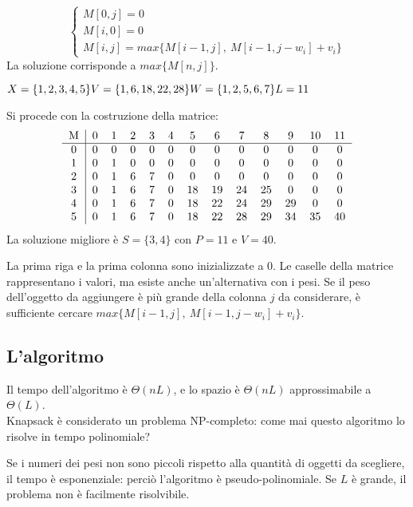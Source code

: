 $$\begin{cases}
M[0, j] = 0 \\
M[i, 0] = 0 \\
M[i, j] = max\{M[i-1, j],\ M[i-1, j-w_i] + v_i\}
\end{cases}$$
La soluzione corrisponde a $max\{M[n, j]\}$.

\begin{example}{}{}
$X = \{1, 2, 3, 4, 5\} \\
V = \{1, 6, 18, 22, 28\} \\
W = \{1, 2, 5, 6, 7\} \\
L = 11$

Si procede con la costruzione della matrice:
$$\begin{tabular}{c | c c c c c c c c c c c c}
	M & 0 & 1 & 2 & 3 & 4 & 5 & 6 & 7 & 8 & 9 & 10 & 11 \\
	\hline
	0 & 0 & 0 & 0 & 0 & 0 & 0 & 0 & 0 & 0 & 0 & 0 & 0 \\
	1 & 0 & 1 & 0 & 0 & 0 & 0 & 0 & 0 & 0 & 0 & 0 & 0 \\
	2 & 0 & 1 & 6 & 7 & 0 & 0 & 0 & 0 & 0 & 0 & 0 & 0 \\
	3 & 0 & 1 & 6 & 7 & 0 & 18 & 19 & 24 & 25 & 0 & 0 & 0 \\
	4 & 0 & 1 & 6 & 7 & 0 & 18 & 22 & 24 & 29 & 29 & 0 & 0 \\
	5 & 0 & 1 & 6 & 7 & 0 & 18 & 22 & 28 & 29 & 34 & 35 & 40 \\
\end{tabular}$$
La soluzione migliore è $S = \{3, 4\}$ con $P = 11$ e $V = 40$.

La prima riga e la prima colonna sono inizializzate a 0. Le caselle della matrice rappresentano i valori, ma esiste anche un'alternativa con i pesi. Se il peso dell'oggetto da aggiungere è più grande della colonna $j$ da considerare, è sufficiente cercare $max\{M[i-1, j],\ M[i-1, j-w_i] + v_i\}$. 
\end{example}

\subsection{L'algoritmo}
Il tempo dell'algoritmo è $\Theta(nL)$, e lo spazio è $\Theta(nL)$ approssimabile a $\Theta(L)$. \\
Knapsack è considerato un problema NP-completo: come mai questo algoritmo lo risolve in tempo polinomiale? 

Se i numeri dei pesi non sono piccoli rispetto alla quantità di oggetti da scegliere, il tempo è esponenziale: perciò l'algoritmo è pseudo-polinomiale. Se $L$ è grande, il problema non è facilmente risolvibile. 

